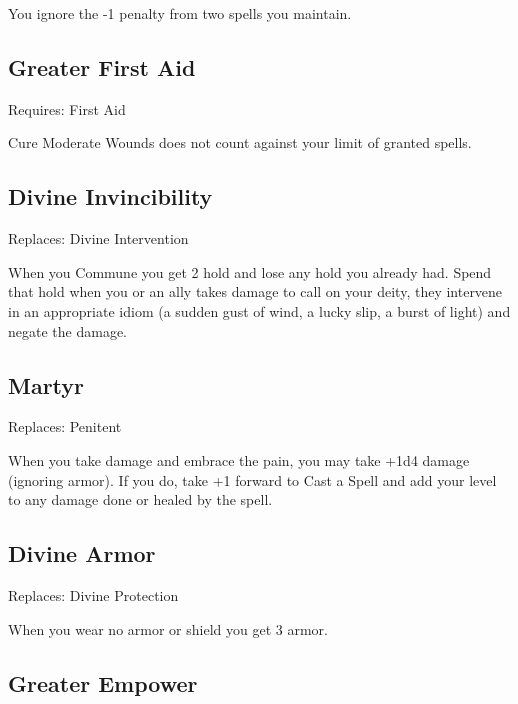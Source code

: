 You ignore the -1 penalty from two spells you maintain.

         
\subsection{Greater First Aid}    
         

Requires: First Aid

         

Cure Moderate Wounds does not count against your limit of granted spells.

         
\subsection{Divine Invincibility}    
         

Replaces: Divine Intervention

         

When you Commune you get 2 hold and lose any hold you already had. Spend that hold when you or an ally takes damage to call on your deity, they intervene in an appropriate idiom (a sudden gust of wind, a lucky slip, a burst of light) and negate the damage.

         
\subsection{Martyr}   
         

Replaces: Penitent

         

When you take damage and embrace the pain, you may take +1d4 damage (ignoring armor). If you do, take +1 forward to Cast a Spell and add your level to any damage done or healed by the spell.

         
\subsection{Divine Armor}    
         

Replaces: Divine Protection

         

When you wear no armor or shield you get 3 armor.

         
\subsection{Greater Empower}    
         


